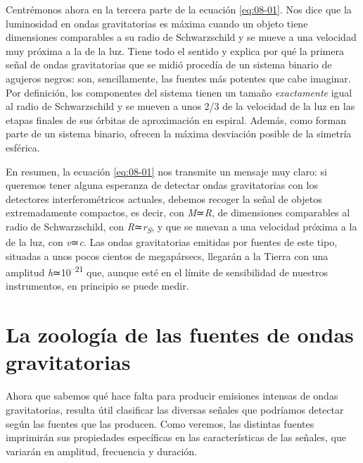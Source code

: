 Centrémonos ahora en la tercera parte de la ecuación \eqref{eq:08-01}. Nos dice que la luminosidad en ondas gravitatorias es máxima cuando un objeto tiene dimensiones comparables a su radio de Schwarzschild y se mueve a una velocidad muy próxima a la de la luz. Tiene todo el sentido y explica por qué la primera señal de ondas gravitatorias que se midió procedía de un sistema binario de agujeros negros: son, sencillamente, las fuentes más potentes que cabe imaginar. Por definición, los componentes del sistema tienen un tamaño \emph{exactamente} igual al radio de Schwarzschild y se mueven a unos 2/3 de la velocidad de la luz en las etapas finales de sus órbitas de aproximación en espiral. Además, como forman parte de un sistema binario, ofrecen la máxima desviación posible de la simetría esférica.

En resumen, la ecuación \eqref{eq:08-01} nos transmite un mensaje muy claro: si queremos tener alguna esperanza de detectar ondas gravitatorias con los detectores interferométricos actuales, debemos recoger la señal de objetos extremadamente compactos, es decir, con \emph{M}≃\emph{R}, de dimensiones comparables al radio de Schwarzschild, con \emph{R}≃\emph{r\textsubscript{S}}, y que se muevan a una velocidad próxima a la de la luz, con \emph{v}≃\emph{c}. Las ondas gravitatorias emitidas por fuentes de este tipo, situadas a unos pocos cientos de megapársecs, llegarán a la Tierra con una amplitud \emph{h}≃10\textsuperscript{--21} que, aunque esté en el límite de sensibilidad de nuestros instrumentos, en principio se puede medir.

\section{La zoología de las fuentes de ondas gravitatorias}\label{sec:08-zoology}

Ahora que sabemos qué hace falta para producir emisiones intensas de ondas gravitatorias, resulta útil clasificar las diversas señales que podríamos detectar según las fuentes que las producen. Como veremos, las distintas fuentes imprimirán sus propiedades específicas en las características de las señales, que variarán en amplitud, frecuencia y duración.

